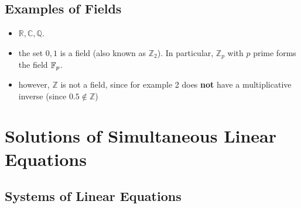 \documentclass{exam}
\begin{document}
\subsection{Examples of Fields}

\begin{itemize}
    \item $\mathbb{R}, \mathbb{C}, \mathbb{Q}$.
    \item the set ${0,1}$ is a field (also known as $\mathbb{Z}_2$). In particular, $\mathbb{Z}_p$ with $p$ prime forms the field $\mathbb{F}_p$.
    \item however, $\mathbb{Z}$ is not a field, since for example 2 does \textbf{not} have a multiplicative inverse (since $0.5 \not\in \mathbb{Z}$)
\end{itemize}

\section{Solutions of Simultaneous Linear Equations}

\subsection{Systems of Linear Equations}

\newcommand{\hsep}{0.27cm}
\end{document}
